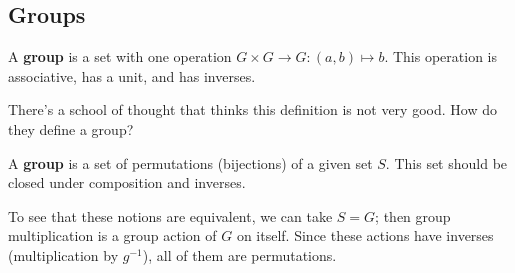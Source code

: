 \subsection{Groups}
\begin{definition}
    A \textbf{group} is a set with one operation $G \times G \to G: (a, b) \mapsto b$.
    This operation is associative, has a unit, and has inverses.
\end{definition}
There's a school of thought that thinks this definition is not very good. How do they define a group?
\begin{definition}
    A \textbf{group} is a set of permutations (bijections) of a given set $S$.
    This set should be closed under composition and inverses.
\end{definition}
To see that these notions are equivalent, we can take $S = G$; then group multiplication is a group
action of $G$ on itself.
Since these actions have inverses (multiplication by $g^{-1}$),
all of them are permutations.

